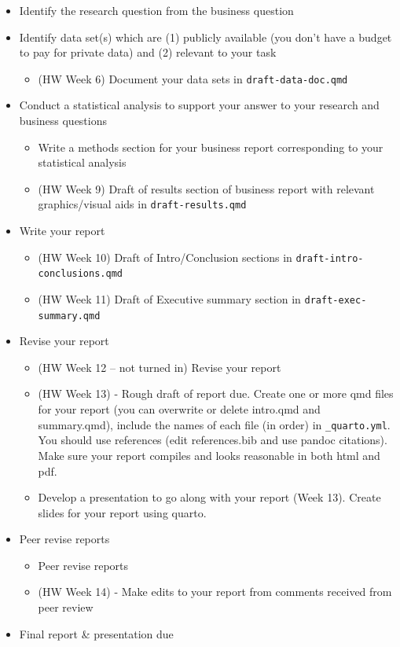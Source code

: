 \documentclass[
  letterpaper,
  DIV=11,
  numbers=noendperiod]{scrreprt}
\providecommand{\tightlist}{%
  \setlength{\itemsep}{0pt}\setlength{\parskip}{0pt}}\usepackage{longtable,booktabs,array}
\begin{document}
\begin{itemize}
\item
  Identify the research question from the business question
\item
  Identify data set(s) which are (1) publicly available (you don't have
  a budget to pay for private data) and (2) relevant to your task

  \begin{itemize}
  \tightlist
  \item
    (HW Week 6) Document your data sets in \texttt{draft-data-doc.qmd}
  \end{itemize}
\item
  Conduct a statistical analysis to support your answer to your research
  and business questions

  \begin{itemize}
  \item
    Write a methods section for your business report corresponding to
    your statistical analysis
  \item
    (HW Week 9) Draft of results section of business report with
    relevant graphics/visual aids in \texttt{draft-results.qmd}
  \end{itemize}
\item
  Write your report

  \begin{itemize}
  \item
    (HW Week 10) Draft of Intro/Conclusion sections in
    \texttt{draft-intro-conclusions.qmd}
  \item
    (HW Week 11) Draft of Executive summary section in
    \texttt{draft-exec-summary.qmd}
  \end{itemize}
\item
  Revise your report

  \begin{itemize}
  \item
    (HW Week 12 -- not turned in) Revise your report
  \item
    (HW Week 13) - Rough draft of report due. Create one or more qmd
    files for your report (you can overwrite or delete intro.qmd and
    summary.qmd), include the names of each file (in order) in
    \texttt{\_quarto.yml}. You should use references (edit
    references.bib and use pandoc citations). Make sure your report
    compiles and looks reasonable in both html and pdf.
  \item
    Develop a presentation to go along with your report (Week 13).
    Create slides for your report using quarto.
  \end{itemize}
\item
  Peer revise reports

  \begin{itemize}
  \item
    Peer revise reports
  \item
    (HW Week 14) - Make edits to your report from comments received from
    peer review
  \end{itemize}
\item
  Final report \& presentation due
\end{itemize}
\end{document}
